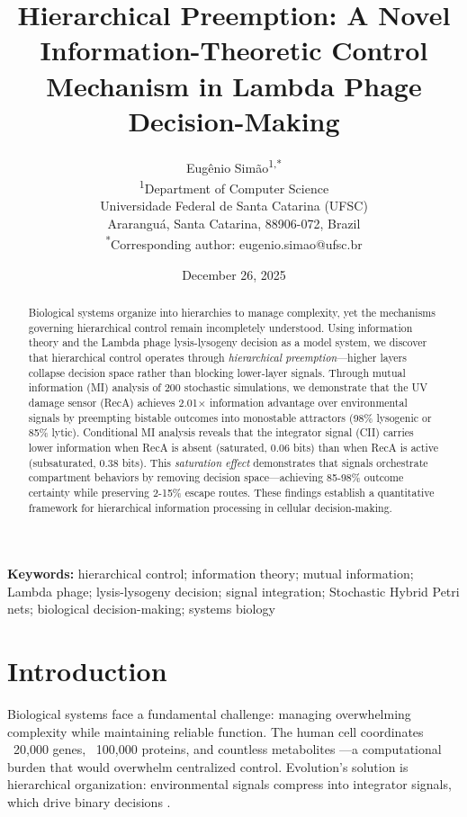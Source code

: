 \documentclass[10pt,twocolumn]{article}
\title{\textbf{Hierarchical Preemption: A Novel Information-Theoretic Control Mechanism in Lambda Phage Decision-Making}}
\author{
Eugênio Simão\textsuperscript{1,*}\\
\textsuperscript{1}Department of Computer Science\\
Universidade Federal de Santa Catarina (UFSC)\\
Araranguá, Santa Catarina, 88906-072, Brazil\\
\textsuperscript{*}Corresponding author: eugenio.simao@ufsc.br
}
\date{December 26, 2025}
\begin{document}
\maketitle

\begin{abstract}
Biological systems organize into hierarchies to manage complexity, yet the mechanisms governing hierarchical control remain incompletely understood. Using information theory \cite{shannon1948,cover2006} and the Lambda phage lysis-lysogeny decision as a model system, we discover that hierarchical control operates through \textit{hierarchical preemption}—higher layers collapse decision space rather than blocking lower-layer signals. Through mutual information (MI) analysis of 200 stochastic simulations, we demonstrate that the UV damage sensor (RecA) achieves 2.01× information advantage over environmental signals by preempting bistable outcomes into monostable attractors (98\% lysogenic or 85\% lytic). Conditional MI analysis reveals that the integrator signal (CII) carries lower information when RecA is absent (saturated, 0.06 bits) than when RecA is active (subsaturated, 0.38 bits). This \textit{saturation effect} demonstrates that signals orchestrate compartment behaviors by removing decision space—achieving 85-98\% outcome certainty while preserving 2-15\% escape routes. These findings establish a quantitative framework for hierarchical information processing in cellular decision-making.
\end{abstract}

\noindent\textbf{Keywords:} hierarchical control; information theory; mutual information; Lambda phage; lysis-lysogeny decision; signal integration; Stochastic Hybrid Petri nets; biological decision-making; systems biology

\section{Introduction}

Biological systems face a fundamental challenge: managing overwhelming complexity while maintaining reliable function. The human cell coordinates ~20,000 genes, ~100,000 proteins, and countless metabolites \cite{alberts2015}—a computational burden that would overwhelm centralized control. Evolution's solution is hierarchical organization: environmental signals compress into integrator signals, which drive binary decisions \cite{alon2007}.
\end{document}
